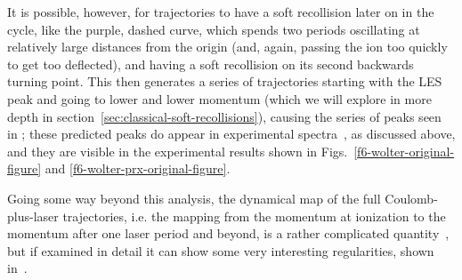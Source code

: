 It is possible, however, for trajectories to have a soft recollision later on in the cycle, like the purple, dashed curve, which spends two periods oscillating at relatively large distances from the origin (and, again, passing the ion too quickly to get too deflected), and having a soft recollision on its second backwards turning point. This then generates a series of trajectories starting with the LES peak and going to lower and lower momentum (which we will explore in more depth in section~\ref{sec:classical-soft-recollisions}), causing the series of peaks seen in ; these predicted peaks do appear in experimental spectra~\cite{ZES_paper, Wolter_PRX}, as discussed above, and they are visible in the experimental results shown in Figs.~\ref{f6-wolter-original-figure} and \ref{f6-wolter-prx-original-figure}.

%
%


Going some way beyond this analysis, the dynamical map of the full Coulomb-plus-laser trajectories, i.e. the mapping from the momentum at ionization to the momentum after one laser period and beyond, is a rather complicated quantity~\cite[cf.][Fig.~7]{Becker_rescattering}, but if examined in detail it can show some very interesting regularities, shown in~.


